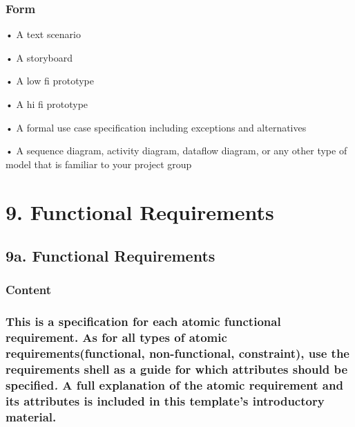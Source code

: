\documentclass[
]{article}
\begin{document}
\hypertarget{form-27}{%
\subsubsection{Form}\label{form-27}}

• A text scenario

• A storyboard

• A low fi prototype

• A hi fi prototype

• A formal use case specification including exceptions and alternatives

• A sequence diagram, activity diagram, dataflow diagram, or any other
type of model that is familiar to your project group

\hypertarget{functional-requirements-1}{%
\section{\texorpdfstring{9. Functional Requirements
}{9. Functional Requirements }}\label{functional-requirements-1}}

\hypertarget{a.-functional-requirements}{%
\subsection{9a. Functional
Requirements}\label{a.-functional-requirements}}

\hypertarget{content-29}{%
\subsubsection{Content}\label{content-29}}

\hypertarget{this-is-a-specification-for-each-atomic-functional-requirement.-as-for-all-types-of-atomic-requirementsfunctional-non-functional-constraint-use-the-requirements-shell-as-a-guide-for-which-attributes-should-be-specified.-a-full-explanation-of-the-atomic-requirement-and-its-attributes-is-included-in-this-templates-introductory-material.}{%
\subsubsection{\texorpdfstring{This is a specification for each atomic
functional requirement. As for all types of atomic
requirements(functional, non-functional, constraint), use the
requirements shell as a guide for which attributes should be
specified\emph{.} A full explanation of the atomic requirement and its
attributes is included in this template's introductory
material.}{This is a specification for each atomic functional requirement. As for all types of atomic requirements(functional, non-functional, constraint), use the requirements shell as a guide for which attributes should be specified. A full explanation of the atomic requirement and its attributes is included in this template's introductory material.}}\label{this-is-a-specification-for-each-atomic-functional-requirement.-as-for-all-types-of-atomic-requirementsfunctional-non-functional-constraint-use-the-requirements-shell-as-a-guide-for-which-attributes-should-be-specified.-a-full-explanation-of-the-atomic-requirement-and-its-attributes-is-included-in-this-templates-introductory-material.}}
\end{document}
